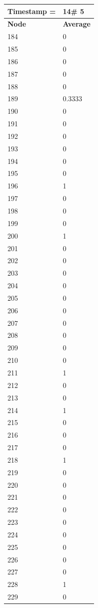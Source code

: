 \begin{tabular}{|l||l|}
\hline
\textbf{Timestamp =} & \textbf{14}\# 5\\\hline
	\textbf{Node} & \textbf{Average} \\ \hline
\hline
	184 & 0 \\ \hline
	185 & 0 \\ \hline
	186 & 0 \\ \hline
	187 & 0 \\ \hline
	188 & 0 \\ \hline
	189 & 0.3333 \\ \hline
	190 & 0 \\ \hline
	191 & 0 \\ \hline
	192 & 0 \\ \hline
	193 & 0 \\ \hline
	194 & 0 \\ \hline
	195 & 0 \\ \hline
	196 & 1 \\ \hline
	197 & 0 \\ \hline
	198 & 0 \\ \hline
	199 & 0 \\ \hline
	200 & 1 \\ \hline
	201 & 0 \\ \hline
	202 & 0 \\ \hline
	203 & 0 \\ \hline
	204 & 0 \\ \hline
	205 & 0 \\ \hline
	206 & 0 \\ \hline
	207 & 0 \\ \hline
	208 & 0 \\ \hline
	209 & 0 \\ \hline
	210 & 0 \\ \hline
	211 & 1 \\ \hline
	212 & 0 \\ \hline
	213 & 0 \\ \hline
	214 & 1 \\ \hline
	215 & 0 \\ \hline
	216 & 0 \\ \hline
	217 & 0 \\ \hline
	218 & 1 \\ \hline
	219 & 0 \\ \hline
	220 & 0 \\ \hline
	221 & 0 \\ \hline
	222 & 0 \\ \hline
	223 & 0 \\ \hline
	224 & 0 \\ \hline
	225 & 0 \\ \hline
	226 & 0 \\ \hline
	227 & 0 \\ \hline
	228 & 1 \\ \hline
	229 & 0 \\ \hline
\end{tabular}
